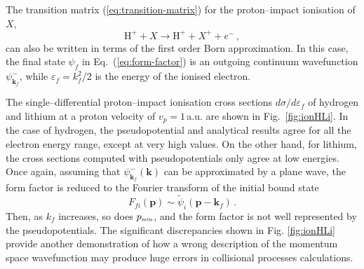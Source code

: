 \documentclass[10pt]{article}
\begin{document}
The transition matrix (\ref{eq:transition-matrix}) for the 
proton--impact ionisation of $X$,
\begin{equation}
 \mbox{H}^+ + X \rightarrow \mbox{H}^+ + X^+ + e^-\,,
\end{equation}
can also be written in terms of the first order Born approximation. 
In this case, the final state $\psi_{\!f}$ in 
Eq.~(\ref{eq:form-factor}) is an outgoing continuum wavefunction 
$\psi_{\mathbf{k}_{\!f}}^-$, while $\varepsilon_{\!f}=k_{\!f}^2/2$ is 
the energy of the ionised electron. 

The single--differential proton--impact ionisation cross sections 
$d\sigma/d\varepsilon_{\!f}$ of hydrogen and lithium at a proton 
velocity of $v_p=1$\,a.u. are shown in Fig.~\ref{fig:ionHLi}. In the 
case of hydrogen, the pseudopotential and analytical results agree 
for all the electron energy range, except at very high values. On the 
other hand, for lithium, the cross sections computed with 
pseudopotentials only agree at low energies. Once again, assuming 
that $\psi_{\mathbf{k}_{\!f}}^-(\mathbf{k})$ can be approximated by a 
plane wave, the form factor is reduced to the Fourier transform of 
the initial bound state
\begin{equation}
 F_{\!fi}(\mathbf{p})\sim\widetilde{\psi}_i(\mathbf{p}-\mathbf{k}_{\!f})\,.
\end{equation}
Then, as $k_{\!f}$ increases, so does $p_{\mbox{\tiny min}}$, and the 
form factor is not well represented by the pseudopotentials. The 
significant discrepancies shown in Fig. \ref{fig:ionHLi} provide 
another demonstration of how a wrong description of the momentum 
space wavefunction may produce huge errors in collisional processes 
calculations.
\end{document}
